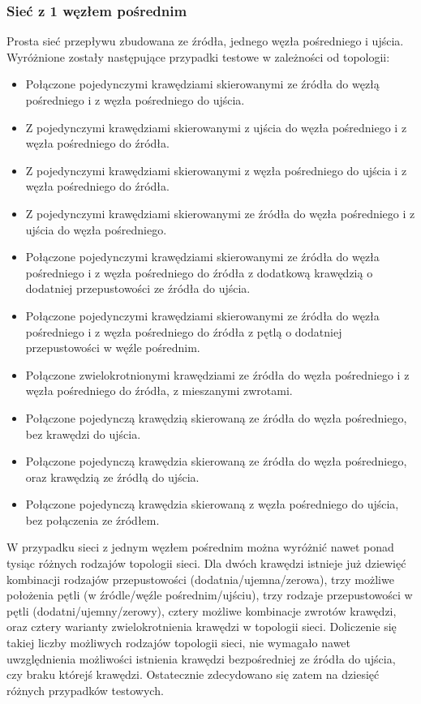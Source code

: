 \subsubsection{Sieć z 1 węzłem pośrednim}
Prosta sieć przepływu zbudowana ze źródła, jednego węzła pośredniego i ujścia.
Wyróżnione zostały następujące przypadki testowe w zależności od topologii:
\begin{itemize}[nosep]
    \item Połączone pojedynczymi krawędziami skierowanymi ze źródła do węzłą
    pośredniego i z węzła pośredniego do ujścia.
    \item Z pojedynczymi krawędziami skierowanymi z ujścia do węzła pośredniego
    i z węzła pośredniego do źródła.
    \item Z pojedynczymi krawędziami skierowanymi z węzła pośredniego do ujścia
    i z węzła pośredniego do źródła.
    \item Z pojedynczymi krawędziami skierowanymi ze źródła do węzła pośredniego
    i z ujścia do węzła pośredniego.
    \item Połączone pojedynczymi krawędziami skierowanymi ze źródła do węzła
    pośredniego i z węzła pośredniego do źródła z dodatkową krawędzią o
    dodatniej przepustowości ze źródła do ujścia.
    \item Połączone pojedynczymi krawędziami skierowanymi ze źródła do węzła
    pośredniego i z węzła pośredniego do źródła z pętlą o dodatniej
    przepustowości w węźle pośrednim.
    \item Połączone zwielokrotnionymi krawędziami ze źródła do węzła pośredniego
    i z węzła pośredniego do źródła, z mieszanymi zwrotami.
    \item Połączone pojedynczą krawędzią skierowaną ze źródła do węzła
    pośredniego, bez krawędzi do ujścia.
    \item Połączone pojedynczą krawędzia skierowaną ze źródła do węzła
    pośredniego, oraz krawędzią ze źródłą do ujścia.
    \item Połączone pojedynczą krawędzia skierowaną z węzła pośredniego do
    ujścia, bez połączenia ze źródłem.
\end{itemize}
W przypadku sieci z jednym węzłem pośrednim można wyróżnić nawet ponad tysiąc
różnych rodzajów topologii sieci. Dla dwóch krawędzi istnieje już dziewięć
kombinacji rodzajów przepustowości (dodatnia/ujemna/zerowa), trzy możliwe
położenia pętli (w źródle/węźle pośrednim/ujściu), trzy rodzaje przepustowości w
pętli (dodatni/ujemny/zerowy), cztery możliwe kombinacje zwrotów krawędzi, oraz
cztery warianty zwielokrotnienia krawędzi w topologii sieci. Doliczenie się
takiej liczby możliwych rodzajów topologii sieci, nie wymagało nawet
uwzględnienia możliwości istnienia krawędzi bezpośredniej ze źródła do ujścia,
czy braku którejś krawędzi. Ostatecznie zdecydowano się zatem na dziesięć
różnych przypadków testowych.

